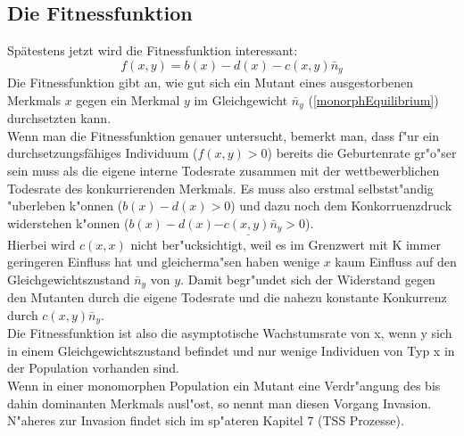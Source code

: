 \documentclass[11pt, a4paper, german]{article}
\theoremstyle{plain}
\begin{document}
	\subsection{Die Fitnessfunktion}
		Spätestens jetzt wird die Fitnessfunktion interessant:
		\[ f(x,y) = b(x) - d(x) - c(x,y)\bar{n}_y \]
		Die Fitnessfunktion gibt an, wie gut sich ein Mutant eines ausgestorbenen Merkmals $ x $ gegen ein Merkmal $ y $ im Gleichgewicht $ \bar{n}_y $ (\ref{monorphEquilibrium}) durchsetzten kann.\\
		Wenn man die Fitnessfunktion genauer untersucht, bemerkt man, dass f"ur ein durchsetzungsfähiges Individuum ($ f(x,y) > 0 $) bereits die Geburtenrate gr"o"ser sein muss als die eigene interne Todesrate zusammen mit der wettbewerblichen Todesrate des konkurrierenden Merkmals. Es muss also erstmal selbstst"andig "uberleben k"onnen ($ b(x) - d(x) > 0 $) und dazu noch dem Konkorruenzdruck widerstehen k"onnen ($ b(x) - d(x) \underline{- c(x,y)\bar{n}_y} > 0 $).\\
		Hierbei wird $ c(x,x) $ nicht ber"ucksichtigt, weil es im Grenzwert mit K immer geringeren Einfluss hat und gleicherma"sen haben wenige $ x $ kaum Einfluss auf den Gleichgewichtszustand $ \bar{n}_y $ von $ y $. Damit begr"undet sich der Widerstand gegen den Mutanten durch die eigene Todesrate und die nahezu konstante Konkurrenz durch $ c(x,y)\bar{n}_y $.\\
		Die Fitnessfunktion ist also die asymptotische Wachstumsrate von x, wenn y sich in einem Gleichgewichtszustand befindet und nur wenige Individuen von Typ x in der Population vorhanden sind.\\
		Wenn in einer monomorphen Population ein Mutant eine Verdr"angung des bis dahin dominanten Merkmals ausl"ost, so nennt man diesen Vorgang Invasion. N"aheres zur Invasion findet sich im sp"ateren Kapitel 7 (TSS Prozesse).
	
\end{document}
